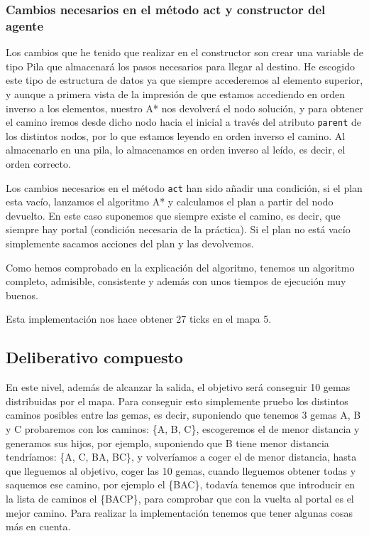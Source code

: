 \documentclass[10pt, spanish]{article}
\begin{document}
\subsubsection{Cambios necesarios en el método act y constructor del agente}

Los cambios que he tenido que realizar en el constructor son crear una variable de tipo Pila que almacenará los pasos necesarios para llegar al destino. He escogido este tipo de estructura de datos ya que siempre accederemos al elemento superior, y aunque a primera vista de la impresión de que estamos accediendo en orden inverso a los elementos, nuestro A* nos devolverá el nodo solución, y para obtener el camino iremos desde dicho nodo hacia el inicial a través del atributo \texttt{parent} de los distintos nodos, por lo que estamos leyendo en orden inverso el camino. Al almacenarlo en una pila, lo almacenamos en orden inverso al leído, es decir, el orden correcto.

Los cambios necesarios en el método \texttt{act} han sido añadir una condición, si el plan esta vacío, lanzamos el algoritmo A* y calculamos el plan a partir del nodo devuelto. En este caso suponemos que siempre existe el camino, es decir, que siempre hay portal (condición necesaria de la práctica). Si el plan no está vacío simplemente sacamos acciones del plan y las devolvemos.

Como hemos comprobado en la explicación del algoritmo, tenemos un algoritmo completo, admisible, consistente y además con unos tiempos de ejecución muy buenos.

Esta implementación nos hace obtener 27 ticks en el mapa 5.

\newpage

\subsection{Deliberativo compuesto}

En este nivel, además de alcanzar la salida, el objetivo será conseguir 10 gemas distribuidas por el mapa. Para conseguir esto simplemente pruebo los distintos caminos posibles entre las gemas, es decir, suponiendo que tenemos 3 gemas A, B y C probaremos con los caminos: \{A, B, C\}, escogeremos el de menor distancia y generamos sus hijos, por ejemplo, suponiendo que B tiene menor distancia tendríamos: \{A, C, BA, BC\}, y volveríamos a coger el de menor distancia, hasta que lleguemos al objetivo, coger las 10 gemas, cuando lleguemos obtener todas y saquemos ese camino, por ejemplo el \{BAC\}, todavía tenemos que introducir en la lista de caminos el \{BACP\}, para comprobar que con la vuelta al portal es el mejor camino. Para realizar la implementación tenemos que tener algunas cosas más en cuenta.
\end{document}
